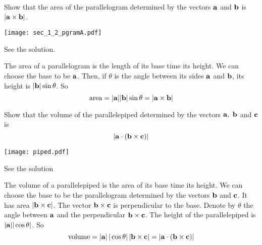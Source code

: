 \begin{question}
Show that the area of the parallelogram determined by the
vectors $\mathbf{a}$ and $\mathbf{b}$ is $|\mathbf{a}\times \mathbf{b}|$.

\begin{center}
     \texttt{[image: sec\_1\_2\_pgramA.pdf]}
\end{center}

\end{question}


\begin{answer}
See the solution.
\end{answer}

\begin{solution}
 The area of a parallelogram is the length of its
base time its height. 
%
We can choose the base to be $\mathbf{a}$. Then, if $\theta$
is the angle between its sides $\mathbf{a}$ and $\mathbf{b}$, its height is 
$|\mathbf{b}|\sin\theta$.  
So
\begin{equation*}
\text{area} = |\mathbf{a}||\mathbf{b}|\sin\theta=|\mathbf{a}\times\mathbf{b}|
\end{equation*}
\end{solution}

\begin{question}
Show that the volume of the parallelepiped determined by the
vectors $\mathbf{a},\ \mathbf{b}$ and $\mathbf{c}$ is 
\begin{equation*}
    |\mathbf{a}\cdot(\mathbf{b}\times\mathbf{c})|
\end{equation*}

\begin{center}
     \texttt{[image: piped.pdf]}
\end{center}

\end{question}


\begin{answer}
See the solution
\end{answer}

\begin{solution}
The volume of a parallelepiped is the area of its
base time its height. We can choose the base to be the parallelogram 
determined by the vectors $\mathbf{b}$ and $\mathbf{c}$. It has area $|\mathbf{b}\times\mathbf{c}|$.
The vector $\mathbf{b}\times\mathbf{c}$ is perpendicular to the base. 
%
Denote by
$\theta$ the angle between $\mathbf{a}$ and the perpendicular $\mathbf{b}\times\mathbf{c}$.
The height of the parallelepiped is $|\mathbf{a}| |\cos\theta|$. So 
\begin{equation*}
\text{volume} = |\mathbf{a}|\, |\cos\theta|\, |\mathbf{b}\times\mathbf{c}|
=|\mathbf{a}\cdot(\mathbf{b}\times\mathbf{c})|
\end{equation*}
\end{solution}

